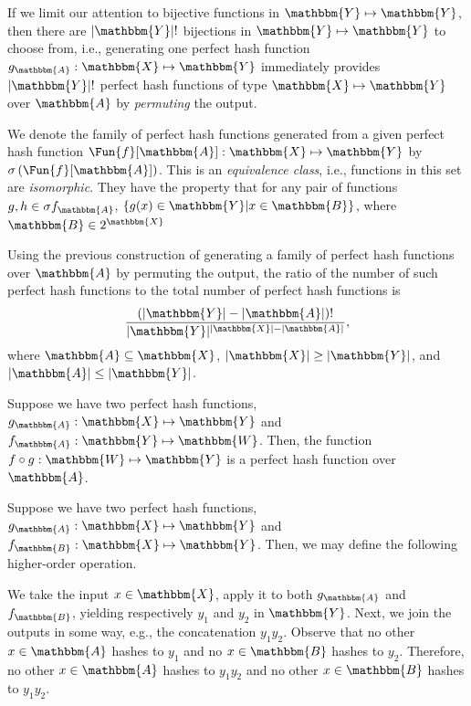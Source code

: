 \documentclass[hidelinks,11pt,final]{article}
\theoremstyle{plain}
\begin{document}
If we limit our attention to bijective functions in $\mathbbm{Y} \mapsto \mathbbm{Y}$, then there are $|\mathbbm{Y}|!$ bijections in $\mathbbm{Y} \mapsto \mathbbm{Y}$ to choose from, i.e., generating one perfect hash function $g_\mathbbm{A} : \mathbbm{X} \mapsto \mathbbm{Y}$ immediately provides $|\mathbbm{Y}|!$ perfect hash functions of type $\mathbbm{X} \mapsto \mathbbm{Y}$ over $\mathbbm{A}$ by \emph{permuting} the output.

We denote the family of perfect hash functions generated from a given perfect hash function $\Fun{f}[\mathbbm{A}] : \mathbbm{X} \mapsto \mathbbm{Y}$ by $\sigma\left(\Fun{f}[\mathbbm{A}]\right)$.
This is an \emph{equivalence class}, i.e., functions in this set are \emph{isomorphic}.
They have the property that for any pair of functions $g,h \in \sigma f_\mathbbm{A}$, $\{ g(x) \in \mathbbm{Y} | x \in \mathbbm{B}\}$, where $\mathbbm{B} \in 2^{\mathbbm{X}}$

Using the previous construction of generating a family of perfect hash functions over $\mathbbm{A}$ by permuting the output, the ratio of the number of such perfect hash functions to the total number of perfect hash functions is
\begin{equation}
	\frac
	{
		\left(|\mathbbm{Y}| - |\mathbbm{A}|\right)!
	}
	{
		|\mathbbm{Y}|^{|\mathbbm{X}| - |\mathbbm{A}|}
	},
\end{equation}
where $\mathbbm{A} \subseteq \mathbbm{X}$, $|\mathbbm{X}| \geq |\mathbbm{Y}|$, and $|\mathbbm{A}| \leq |\mathbbm{Y}|$.

Suppose we have two perfect hash functions, $g_\mathbbm{A} : \mathbbm{X} \mapsto \mathbbm{Y}$ and $f_\mathbbm{A} : \mathbbm{Y} \mapsto \mathbbm{W}$.
Then, the function $f \circ g : \mathbbm{W} \mapsto \mathbbm{Y}$ is a perfect hash function over $\mathbbm{A}$.

Suppose we have two perfect hash functions, $g_\mathbbm{A} : \mathbbm{X} \mapsto \mathbbm{Y}$ and $f_\mathbbm{B} : \mathbbm{X} \mapsto \mathbbm{Y}$.
Then, we may define the following higher-order operation.

We take the input $x \in \mathbbm{X}$, apply it to both $g_\mathbbm{A}$ and $f_\mathbbm{B}$, yielding respectively $y_1$ and $y_2$ in $\mathbbm{Y}$.
Next, we join the outputs in some way, e.g., the concatenation $y_1 y_2$.
Observe that no other $x \in \mathbbm{A}$ hashes to $y_1$ and no $x \in \mathbbm{B}$ hashes to $y_2$.
Therefore, no other $x \in \mathbbm{A}$ hashes to $y_1 y_2$ and no other $x \in \mathbbm{B}$ hashes to $y_1 y_2$.
\end{document}
